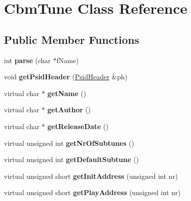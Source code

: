 \hypertarget{class_cbm_tune}{}\section{Cbm\+Tune Class Reference}
\label{class_cbm_tune}
\subsection*{Public Member Functions}
\begin{DoxyCompactItemize}
\item 
\mbox{\label{class_cbm_tune_a2ad59d0809e22fd2af152e0df85c2267}} 
int {\bfseries parse} (char $\ast$f\+Name)
\item 
\mbox{\label{class_cbm_tune_ad3eb79632c110c8aec214821a6624234}} 
void {\bfseries get\+Psid\+Header} (\mbox{\hyperlink{struct_psid_header}{Psid\+Header}} \&ph)
\item 
\mbox{\label{class_cbm_tune_a88971d17cdb38453b45f8abedf2c5167}} 
virtual char $\ast$ {\bfseries get\+Name} ()
\item 
\mbox{\label{class_cbm_tune_a756db133010805fe2b54cc630b6da004}} 
virtual char $\ast$ {\bfseries get\+Author} ()
\item 
\mbox{\label{class_cbm_tune_a7af6f800e371ba9a22277c54ec539f06}} 
virtual char $\ast$ {\bfseries get\+Release\+Date} ()
\item 
\mbox{\label{class_cbm_tune_a9461edf20d8da02ee29e65d296577512}} 
virtual unsigned int {\bfseries get\+Nr\+Of\+Subtunes} ()
\item 
\mbox{\label{class_cbm_tune_ae3eb96292700ab16df7d8cacd3c12cef}} 
virtual unsigned int {\bfseries get\+Default\+Subtune} ()
\item 
\mbox{\label{class_cbm_tune_ae0e314eb38bc175cb2c2f053a639f4d0}} 
virtual unsigned short {\bfseries get\+Init\+Address} (unsigned int nr)
\item 
\mbox{\label{class_cbm_tune_afd5975813d9e74708b31d540408481d6}} 
virtual unsigned short {\bfseries get\+Play\+Address} (unsigned int nr)

\end{DoxyCompactItemize}
